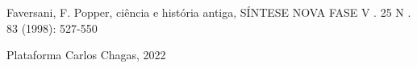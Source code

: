 \documentclass[
12pt,		%
openright,	%
twoside,  %
a4paper,			%
chapter=TITLE,		%
english,			%
french,				%
spanish,			%
brazil				%
]{USPSC-classe/USPSC}
\begin{document}
\begin{flushleft}
\begin{flushleft}
\begin{flushleft}
\begin{flushleft}
\begin{flushleft}
\begin{flushleft}
\begin{flushleft}
\begin{flushleft}
[FAVERSANI, 1998] Faversani, F. Popper, ci\^encia e hist\'oria antiga, S\'INTESE NOVA FASE V . 25 N . 83 (1998): 527-550
\end{flushleft}


\end{flushleft}


\end{flushleft}


\end{flushleft}


\end{flushleft}


\end{flushleft}


\end{flushleft}


\end{flushleft}


\begin{flushleft}
\begin{flushleft}
\begin{flushleft}
\begin{flushleft}
\begin{flushleft}
\begin{flushleft}
\begin{flushleft}
\begin{flushleft}
[CHAGAS, 2022] Plataforma Carlos Chagas, 2022
\end{flushleft}


\end{flushleft}


\end{flushleft}


\end{flushleft}


\end{flushleft}


\end{flushleft}


\end{flushleft}


\end{flushleft}
\end{document}
